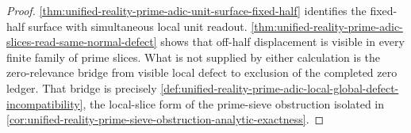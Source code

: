 \begin{proof}
\autoref{thm:unified-reality-prime-adic-unit-surface-fixed-half} identifies
the fixed-half surface with simultaneous local unit readout.
\autoref{thm:unified-reality-prime-adic-slices-read-same-normal-defect}
shows that off-half displacement is visible in every finite family of
prime slices.  What is not supplied by either calculation is the
zero-relevance bridge from visible local defect to exclusion of the
completed zero ledger.  That bridge is precisely
\autoref{def:unified-reality-prime-adic-local-global-defect-incompatibility},
the local-slice form of the prime-sieve obstruction isolated in
\autoref{cor:unified-reality-prime-sieve-obstruction-analytic-exactness}.
\end{proof}

